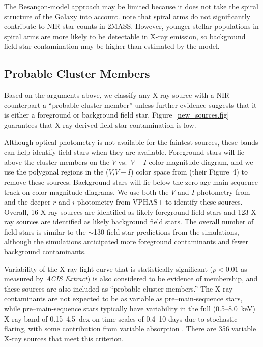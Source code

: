 \documentclass[twocolumn,tighten]{aastex61}
\begin{document}
 The Besan\c{c}on-model approach may be limited because it does not take the spiral structure of the Galaxy into account. \citet{2012A&A...538A.106R} note that spiral arms do not significantly contribute to NIR star counts in 2MASS. However, younger stellar populations in spiral arms are more likely to be detectable in X-ray emission, so background field-star contamination may be higher than estimated by the model.

\subsection{Probable Cluster Members \label{pcm.sec}}
Based on the arguments above, we classify any X-ray source with a NIR counterpart a ``probable cluster member'' unless further evidence suggests that it is either a foreground or background field star. Figure~\ref{new_sources.fig} guarantees that X-ray-derived field-star contamination is low.

Although optical photometry is not available for the faintest sources, these bands can help identify field stars when they are available. Foreground stars will lie above the cluster members on the $V$ vs.\ $V-I$ color-magnitude diagram, and we use the polygonal regions in the ($V$,$V-I$) color space from  (their Figure~4) to remove these sources. Background stars will lie below the zero-age main-sequence track on color-magnitude diagrams. We use both the $V$ and $I$ photometry from \citet{2013AJ....145...37S} and the deeper $r$ and $i$ photometry from VPHAS+ to identify these sources. Overall, 16 X-ray sources are identified as likely foreground field stars and 123 X-ray sources are identified as likely background field stars. The overall number of field stars is similar to the $\sim$130 field star predictions from the simulations, although the simulations anticipated more foreground contaminants and fewer background contaminants.

Variability of the X-ray light curve that is statistically significant ($p<0.01$ as measured by {\it ACIS Extract}) is also considered to be evidence of membership, and these sources are also included as ``probable cluster members.'' The X-ray contaminants are not expected to be as variable as pre--main-sequence stars, while pre--main-sequence stars typically have variability in the full (0.5--8.0~keV) X-ray band of 0.15--4.5~dex on time scales of 0.4--10 days due to stochastic flaring, with some contribution from variable absorption \citep{2012A&A...548A..85F}.  There are 356 variable X-ray sources that meet this criterion. 
\end{document}
